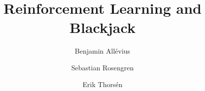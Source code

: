 \documentclass[12pt,a4paper,notitlepage,oneside]{article}
\title{Reinforcement Learning and Blackjack}
\author[1]{Benjamin Allévius}
\author[1]{Sebastian Rosengren}
\author[1]{Erik Thorsén}
\affil[1]{Department of Mathematics, Stockholm University, Sweden}
\date{\vspace{-5ex}}
\begin{document}
\maketitle

\begin{abstract} 
    
\end{abstract}
\thispagestyle{empty}
\clearpage
\setcounter{page}{1}






\end{document}
